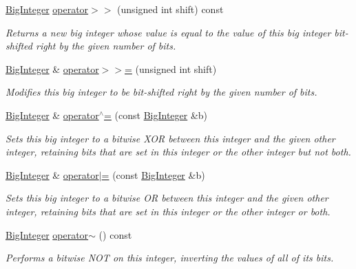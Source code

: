\begin{DoxyCompactItemize}
\mbox{\hyperlink{classBigInteger}{Big\+Integer}} \mbox{\hyperlink{classBigInteger_ae57cca21f624d67485bc6b516980d93e}{operator$>$$>$}} (unsigned int shift) const
\begin{DoxyCompactList}\small\item\em Returns a new big integer whose value is equal to the value of this big integer bit-\/shifted right by the given number of bits. \end{DoxyCompactList}\item 
\mbox{\hyperlink{classBigInteger}{Big\+Integer}} \& \mbox{\hyperlink{classBigInteger_a17190065589ad02d573bbaa3dcb82d2d}{operator$>$$>$=}} (unsigned int shift)
\begin{DoxyCompactList}\small\item\em Modifies this big integer to be bit-\/shifted right by the given number of bits. \end{DoxyCompactList}\item 
\mbox{\hyperlink{classBigInteger}{Big\+Integer}} \& \mbox{\hyperlink{classBigInteger_a99978a2a6d7f37e3e87e784e09368df8}{operator$^\wedge$=}} (const \mbox{\hyperlink{classBigInteger}{Big\+Integer}} \&b)
\begin{DoxyCompactList}\small\item\em Sets this big integer to a bitwise X\+OR between this integer and the given other integer, retaining bits that are set in this integer or the other integer but not both. \end{DoxyCompactList}\item 
\mbox{\hyperlink{classBigInteger}{Big\+Integer}} \& \mbox{\hyperlink{classBigInteger_a1281c69428fefa18e91598c70d7376de}{operator$\vert$=}} (const \mbox{\hyperlink{classBigInteger}{Big\+Integer}} \&b)
\begin{DoxyCompactList}\small\item\em Sets this big integer to a bitwise OR between this integer and the given other integer, retaining bits that are set in this integer or the other integer or both. \end{DoxyCompactList}\item 
\mbox{\hyperlink{classBigInteger}{Big\+Integer}} \mbox{\hyperlink{classBigInteger_ad06e5ca20705adbe0670ba54fcb3323e}{operator$\sim$}} () const
\begin{DoxyCompactList}\small\item\em Performs a bitwise N\+OT on this integer, inverting the values of all of its bits. \end{DoxyCompactList}\item 

\end{DoxyCompactItemize}
